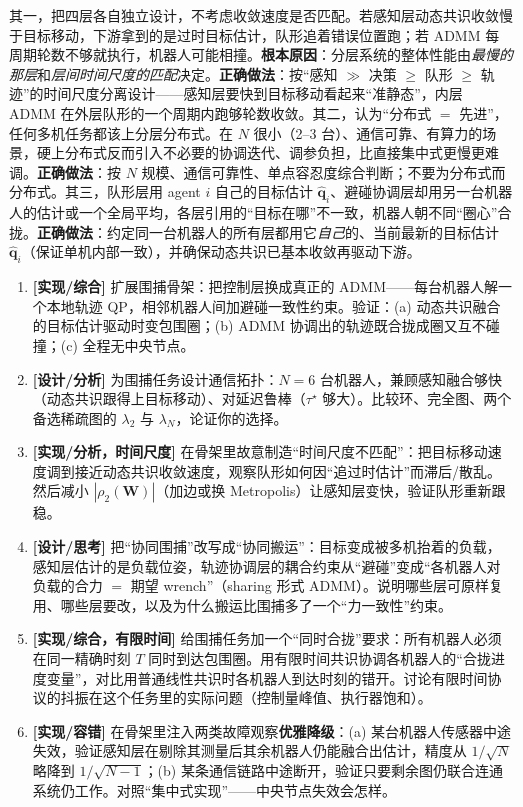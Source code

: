 \begin{pitfall}
其一，把四层各自独立设计，不考虑收敛速度是否匹配。若感知层动态共识收敛慢于目标移动，下游拿到的是过时目标估计，队形追着错误位置跑；若 ADMM 每周期轮数不够就执行，机器人可能相撞。\textbf{根本原因}：分层系统的整体性能由\emph{最慢的那层}和\emph{层间时间尺度的匹配}决定。\textbf{正确做法}：按“感知 $\gg$ 决策 $\ge$ 队形 $\ge$ 轨迹”的时间尺度分离设计——感知层要快到目标移动看起来“准静态”，内层 ADMM 在外层队形的一个周期内跑够轮数收敛。其二，认为“分布式 $=$ 先进”，任何多机任务都该上分层分布式。在 $N$ 很小（2--3 台）、通信可靠、有算力的场景，硬上分布式反而引入不必要的协调迭代、调参负担，比直接集中式更慢更难调。\textbf{正确做法}：按 $N$ 规模、通信可靠性、单点容忍度综合判断；不要为分布式而分布式。其三，队形层用 agent $i$ 自己的目标估计 $\hat{\mathbf{q}}_i$、避碰协调层却用另一台机器人的估计或一个全局平均，各层引用的“目标在哪”不一致，机器人朝不同“圈心”合拢。\textbf{正确做法}：约定同一台机器人的所有层都用它\emph{自己}的、当前最新的目标估计 $\hat{\mathbf{q}}_i$（保证单机内部一致），并确保动态共识已基本收敛再驱动下游。
\end{pitfall}

\begin{practice}
\begin{enumerate}
  \item \textbf{[实现/综合]} 扩展围捕骨架：把控制层换成真正的 ADMM——每台机器人解一个本地轨迹 QP，相邻机器人间加避碰一致性约束。验证：(a) 动态共识融合的目标估计驱动时变包围圈；(b) ADMM 协调出的轨迹既合拢成圈又互不碰撞；(c) 全程无中央节点。
  \item \textbf{[设计/分析]} 为围捕任务设计通信拓扑：$N=6$ 台机器人，兼顾感知融合够快（动态共识跟得上目标移动）、对延迟鲁棒（$\tau^\star$ 够大）。比较环、完全图、两个备选稀疏图的 $\lambda_2$ 与 $\lambda_N$，论证你的选择。
  \item \textbf{[实现/分析，时间尺度]} 在骨架里故意制造“时间尺度不匹配”：把目标移动速度调到接近动态共识收敛速度，观察队形如何因“追过时估计”而滞后/散乱。然后减小 $|\rho_2(\mathbf{W})|$（加边或换 Metropolis）让感知层变快，验证队形重新跟稳。
  \item \textbf{[设计/思考]} 把“协同围捕”改写成“协同搬运”：目标变成被多机抬着的负载，感知层估计的是负载位姿，轨迹协调层的耦合约束从“避碰”变成“各机器人对负载的合力 $=$ 期望 wrench”（sharing 形式 ADMM）。说明哪些层可原样复用、哪些层要改，以及为什么搬运比围捕多了一个“力一致性”约束。
  \item \textbf{[实现/综合，有限时间]} 给围捕任务加一个“同时合拢”要求：所有机器人必须在同一精确时刻 $T$ 同时到达包围圈。用有限时间共识协调各机器人的“合拢进度变量”，对比用普通线性共识时各机器人到达时刻的错开。讨论有限时间协议的抖振在这个任务里的实际问题（控制量峰值、执行器饱和）。
  \item \textbf{[实现/容错]} 在骨架里注入两类故障观察\textbf{优雅降级}：(a) 某台机器人传感器中途失效，验证感知层在剔除其测量后其余机器人仍能融合出估计，精度从 $1/\sqrt N$ 略降到 $1/\sqrt{N-1}$；(b) 某条通信链路中途断开，验证只要剩余图仍联合连通系统仍工作。对照“集中式实现”——中央节点失效会怎样。
\end{enumerate}
\end{practice}

